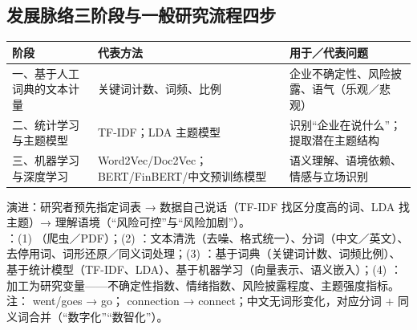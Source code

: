 \subsection{发展脉络三阶段与一般研究流程四步}
\begin{tabD08a}
\begin{tabularx}{\linewidth}{@{}p{3.6cm}LL@{}}
\toprule
阶段 & 代表方法 & 用于／代表问题 \\
\midrule
一、基于人工词典的文本计量 & 关键词计数、词频、比例 & 企业不确定性、风险披露、语气（乐观／悲观）\\
二、统计学习与主题模型 & TF-IDF；LDA 主题模型 & 识别“企业在说什么”；提取潜在主题结构 \\
三、机器学习与深度学习 & Word2Vec/Doc2Vec；BERT/FinBERT/中文预训练模型 & 语义理解、语境依赖、情感与立场识别 \\
\bottomrule
\end{tabularx}
\end{tabD08a}
演进：研究者预先指定词表 → 数据自己说话（TF-IDF 找区分度高的词、LDA 找主题）→ 理解语境（“风险可控”与“风险加剧”）。\\
：(1) （爬虫／PDF）；(2) ：文本清洗（去噪、格式统一）、分词（中文／英文）、去停用词、词形还原／同义词处理；(3) ：基于词典（关键词计数、词频比例）、基于统计模型（TF-IDF、LDA）、基于机器学习（向量表示、语义嵌入）；(4) ：加工为研究变量——不确定性指数、情绪指数、风险披露程度、主题强度指标。注： went/goes → go； connection → connect；中文无词形变化，对应分词 + 同义词合并（“数字化”“数智化”）。

